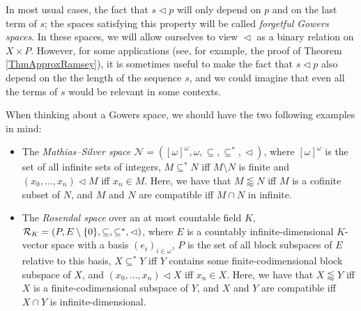 \documentclass[a4paper,11pt]{article}
\theoremstyle{definition}
\numberwithin{equation}{section}
\newcommand{\Ros}{\mathcal{R}}
\newcommand{\elinf}{[\omega]^\omega}
\newcommand{\Sil}{\mathcal{N}}
\begin{document}
In most usual cases, the fact that $s \vartriangleleft p$ will only depend on $p$ and on the last term of $s$; the spaces satisfying this property will be called \emph{forgetful Gowers spaces}. In these spaces, we will allow ourselves to view $\vartriangleleft$ as a binary relation on $X \times P$. However, for some applications (see, for example, the proof of Theorem \ref{ThmApproxRamsey}), it is sometimes useful to make the fact that $s \vartriangleleft p$ also depend on the the length of the sequence $s$, and we could imagine that even all the terms of $s$ would be relevant in some contexts.

\smallskip

When thinking about a Gowers space, we should have the two following examples in mind:

\begin{itemize}

\item The \emph{Mathias--Silver space} $\Sil = (\elinf, \omega, \subseteq, \subseteq^*, \vartriangleleft)$, where $\elinf$ is the set of all infinite sets of integers, $M \subseteq^* N$ iff $M\setminus N$ is finite and $(x_0, \ldots, x_n) \vartriangleleft M$ iff $x_n \in M$. Here, we have that $M \lessapprox N$ iff $M$ is a cofinite subset of $N$, and $M$ and $N$ are compatible iff $M \cap N$ in infinite.

\item The \emph{Rosendal space} over an at most countable field $K$, $\Ros_K = (P, E\setminus\{0\}, \subseteq, \subseteq^*\nolinebreak, \vartriangleleft\nolinebreak)$, where $E$ is a countably infinite-dimensional $K$-vector space with a basis $(e_i)_{i \in \omega}$, $P$ is the set of all block subspaces of $E$ relative to this basis, $X \subseteq^* Y$ iff $Y$ contains some finite-codimensional block subspace of $X$, and $(x_0, \ldots, x_n) \vartriangleleft X$ iff $x_n \in X$. Here, we have that $X \lessapprox Y$ iff $X$ is a finite-codimensional subspace of $Y$, and $X$ and $Y$ are compatible iff $X \cap Y$ is infinite-dimensional. 

\end{itemize}
\end{document}
